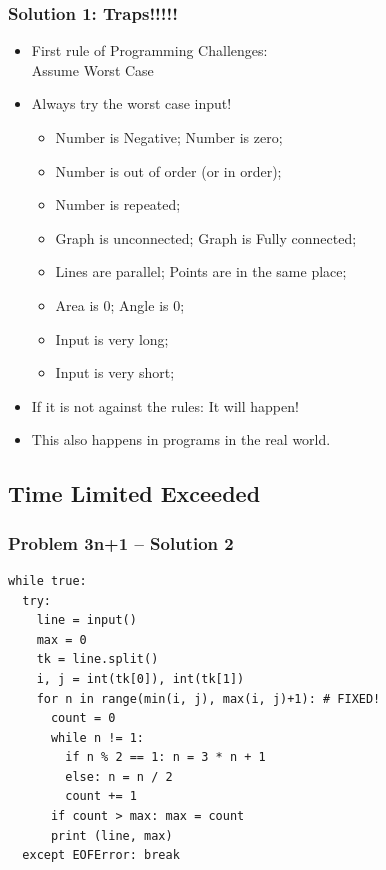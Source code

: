\begin{frame}
  \frametitle{Solution 1: Traps!!!!!}

  \begin{itemize}
    \item First rule of Programming Challenges: \\ \hspace{1cm}\alert{Assume Worst Case}
    \item Always try the worst case input!

    \bigskip

    \begin{itemize}
      \item Number is Negative; Number is zero;
      \item Number is out of order (or in order);
      \item Number is repeated;
      \smallskip

      \item Graph is unconnected; Graph is Fully connected;
      \item Lines are parallel; Points are in the same place;
      \item Area is 0; Angle is 0;
      \smallskip

      \item Input is very long;
      \item Input is very short;
    \end{itemize}
    \bigskip

    \item If it is not against the rules: \alert{It will happen!}
    \item This also happens in programs in the real world.
  \end{itemize}
\end{frame}

\subsection{Time Limited Exceeded}

\begin{frame}[fragile]
  \frametitle{Problem 3n+1 -- Solution 2}
\begin{verbatim}
while true:
  try:
    line = input()
    max = 0
    tk = line.split()
    i, j = int(tk[0]), int(tk[1])
    for n in range(min(i, j), max(i, j)+1): # FIXED!
      count = 0
      while n != 1:
        if n % 2 == 1: n = 3 * n + 1
        else: n = n / 2
        count += 1
      if count > max: max = count
      print (line, max)
  except EOFError: break
\end{verbatim}
\end{frame}

